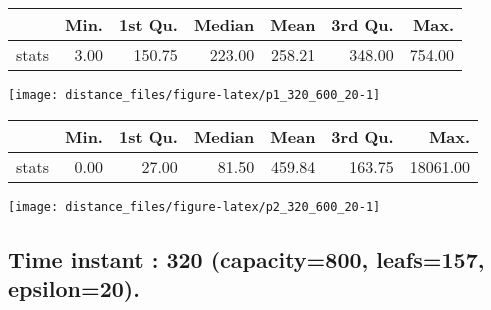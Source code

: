 \documentclass[
  9pt,
  landscape]{article}
\begin{document}
\begin{minipage}{0.5\textwidth} 
\centering 
\begin{tabular}{rrrrrrr}
  \hline
 & Min. & 1st Qu. & Median & Mean & 3rd Qu. & Max. \\ 
  \hline
stats & 3.00 & 150.75 & 223.00 & 258.21 & 348.00 & 754.00 \\ 
   \hline
\end{tabular}
\vspace{0.5cm} 


\texttt{[image: distance\_files/figure-latex/p1\_320\_600\_20-1]} 

\end{minipage} 
\begin{minipage}{0.5\textwidth} 
\centering 
\begin{tabular}{rrrrrrr}
  \hline
 & Min. & 1st Qu. & Median & Mean & 3rd Qu. & Max. \\ 
  \hline
stats & 0.00 & 27.00 & 81.50 & 459.84 & 163.75 & 18061.00 \\ 
   \hline
\end{tabular}
\vspace{0.5cm} 


\texttt{[image: distance\_files/figure-latex/p2\_320\_600\_20-1]} 

\end{minipage}

\pagebreak

\hypertarget{time-instant-320-capacity800-leafs157-epsilon20.}{%
\subsection{Time instant : 320 (capacity=800, leafs=157,
epsilon=20).}\label{time-instant-320-capacity800-leafs157-epsilon20.}}
\end{document}

